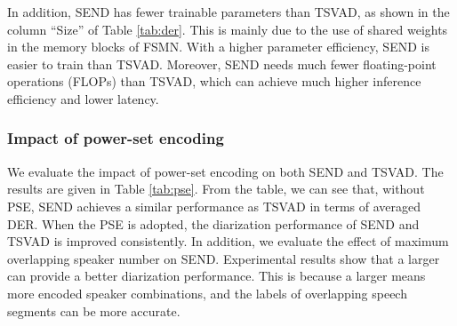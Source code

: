 \documentclass[a4paper]{article}
\begin{document}
In addition, SEND has fewer trainable parameters than TSVAD, as shown in the column ``Size'' of Table \ref{tab:der}. 
This is mainly due to the use of shared weights in the memory blocks of FSMN.
With a higher parameter efficiency, SEND is easier to train than TSVAD. 
Moreover, SEND needs much fewer floating-point operations (FLOPs) than TSVAD, which can achieve much higher inference efficiency and lower latency.
\subsubsection{Impact of power-set encoding}
We evaluate the impact of power-set encoding on both SEND and TSVAD. The results are given in Table \ref{tab:pse}.
From the table, we can see that, without PSE, SEND achieves a similar performance as TSVAD in terms of averaged DER.
When the PSE is adopted, the diarization performance of SEND and TSVAD is improved consistently.
In addition, we evaluate the effect of maximum overlapping speaker number  on SEND.
Experimental results show that a larger  can provide a better diarization performance.
This is because a larger  means more encoded speaker combinations, and the labels of overlapping speech segments can be more accurate.

\begin{table}[t!]
	\caption{The impact of power-set encoding on different models in terms of DER(\%).}
	\label{tab:pse}
	\centering
\end{table}
\end{document}
